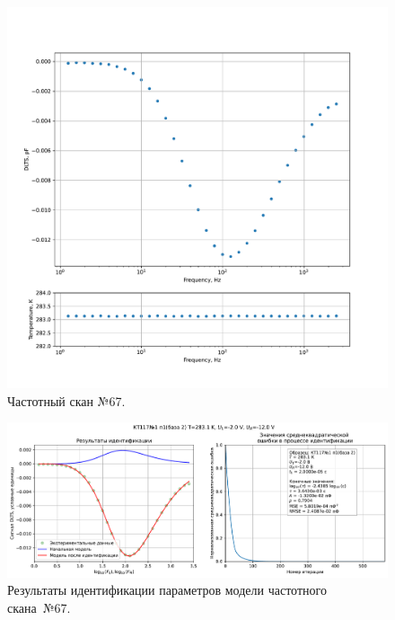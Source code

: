 \begin{figure}[!ht]
    \centering
    \includegraphics[width=1\textwidth]{../plots/КТ117№1_п1(база 2)_2500Гц-1Гц_1пФ_+10С_-2В-12В_200мВ_20мкс_шаг_0,1.pdf}
    \caption{Частотный скан №67.}
    \label{pic:frequency_scan_67}
\end{figure}

\begin{figure}[!ht]
    \centering
    \includegraphics[width=1\textwidth]{../plots/КТ117№1_п1(база 2)_2500Гц-1Гц_1пФ_+10С_-2В-12В_200мВ_20мкс_шаг_0,1_model.pdf}
    \caption{Результаты идентификации параметров модели частотного скана~№67.}
    \label{pic:frequency_scan_model67}
\end{figure}

\pagebreak


